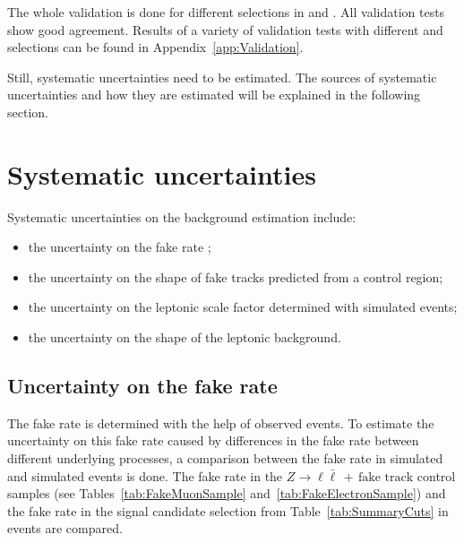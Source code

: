 The whole validation is done for different selections in \pt and \ias.
All validation tests show good agreement.
Results of a variety of validation tests with different \pt and \ias selections can be found in Appendix~\ref{app:Validation}.

Still, systematic uncertainties need to be estimated.
The sources of systematic uncertainties and how they are estimated will be explained in the following section.

\FloatBarrier
\section{Systematic uncertainties}
\label{sec:SysUncertaintiesBkg}

Systematic uncertainties on the background estimation include:
\begin{itemize}
\item the uncertainty on the fake rate \fakerate;
\item the uncertainty on the \ias shape of fake tracks predicted from a control region;
\item the uncertainty on the leptonic scale factor \leptonscalefactor determined with simulated events;
\item the uncertainty on the \ias shape of the leptonic background.
\end{itemize}

\subsection{Uncertainty on the fake rate}
\label{sec:FakeRateUncertainty}
The fake rate \fakerate is determined with the help of observed \Zlep events.
To estimate the uncertainty on this fake rate caused by differences in the fake rate between different underlying processes, a comparison between the fake rate in simulated \ZlepJets and simulated \WJets events is done.
The fake rate in the $Z\rightarrow\ell \bar{\ell}\,+\,\text{fake track}$  control samples (see Tables~\ref{tab:FakeMuonSample} and~\ref{tab:FakeElectronSample}) 
and the fake rate in the signal candidate selection from Table~\ref{tab:SummaryCuts} in \WJets events are compared.

